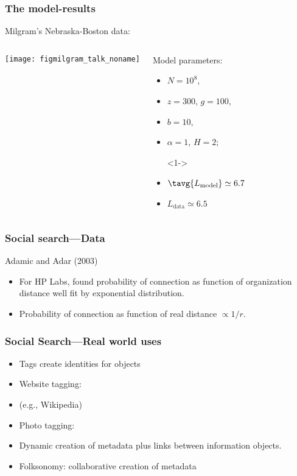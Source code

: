  
\begin{frame}
  \frametitle{The model-results}

  Milgram's Nebraska-Boston data:

  \begin{columns}
    \texttt{[image: figmilgram\_talk\_noname]}%
    \begin{block}{Model parameters:}
      \begin{itemize}
      \item<1->
        $N=10^8$, 
      \item<1->
        $z=300$, $g=100$,
      \item<1->
        $b=10$,  
      \item<1->
        $\alpha=1$, $H=2$; 
      \item[]<1->
      \item<1->
        $\tavg{L_{\textrm{model}}} \simeq 6.7$
      \item<1->
        $L_{\textrm{data}} \simeq 6.5$
      \end{itemize}
    \end{block}
  \end{columns}

\end{frame}

\begin{frame}
  \frametitle{Social search---Data}

  \begin{block}{Adamic and Adar (2003)}
    \begin{itemize}
    \item<1->
      For HP Labs, found probability of connection
      as function of organization distance
      well fit by exponential distribution.
    \item<2->
      Probability of connection as function of
      real distance $\propto 1/r$.
    \end{itemize}
  \end{block}

\end{frame}

\begin{frame}
  \frametitle{Social Search---Real world uses}

  \begin{block}{}
  \begin{itemize}
  \item 
  Tags create identities for objects
  \item 
  Website tagging:
  \item 
  (e.g., Wikipedia)
  \item 
  Photo tagging:
  \item 
  Dynamic creation of metadata
  plus links between information objects.
  \item 
  Folksonomy: collaborative creation of metadata
  \end{itemize}
  \end{block}
  
\end{frame}

